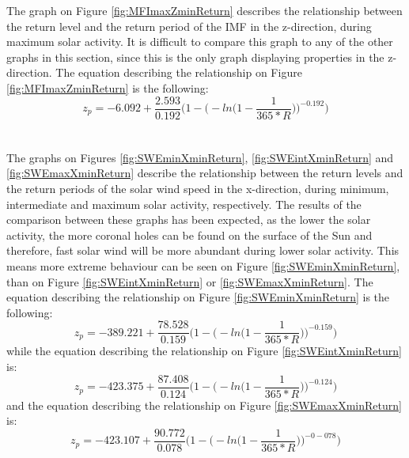 \documentclass[12pt]{article}
\begin{document}
        The graph on Figure \ref{fig:MFImaxZminReturn} describes the relationship between the return level and the return period of the IMF in the z-direction, during maximum solar activity. It is difficult to compare this graph to any of the other graphs in this section, since this is the only graph displaying properties in the z-direction. The equation describing the relationship on Figure \ref{fig:MFImaxZminReturn} is the following:
        \begin{equation}
            z_p = -6.092+\frac{2.593}{0.192}\Bigg( 1-\Bigg( -ln\Bigg( 1-\frac{1}{365*R}\Bigg) \Bigg) ^{-0.192}\Bigg)
        \end{equation}\\ \\
        The graphs on Figures \ref{fig:SWEminXminReturn}, \ref{fig:SWEintXminReturn} and \ref{fig:SWEmaxXminReturn} describe the relationship between the return levels and the return periods of the solar wind speed in the x-direction, during minimum, intermediate and maximum solar activity, respectively. The results of the comparison between these graphs has been expected, as the lower the solar activity, the more coronal holes can be found on the surface of the Sun and therefore, fast solar wind will be more abundant during lower solar activity. This means more extreme behaviour can be seen on Figure \ref{fig:SWEminXminReturn}, than on Figure \ref{fig:SWEintXminReturn} or \ref{fig:SWEmaxXminReturn}. The equation describing the relationship on Figure \ref{fig:SWEminXminReturn} is the following:
        \begin{equation}
            z_p = -389.221+\frac{78.528}{0.159}\Bigg( 1-\Bigg( -ln\Bigg( 1-\frac{1}{365*R}\Bigg) \Bigg) ^{-0.159}\Bigg)
        \end{equation}
        while the equation describing the relationship on Figure \ref{fig:SWEintXminReturn} is:
        \begin{equation}
            z_p = -423.375+\frac{87.408}{0.124}\Bigg( 1-\Bigg( -ln\Bigg( 1-\frac{1}{365*R}\Bigg) \Bigg) ^{-0.124}\Bigg)
        \end{equation}
        and the equation describing the relationship on Figure \ref{fig:SWEmaxXminReturn} is:
        \begin{equation}
            z_p = -423.107+\frac{90.772}{0.078}\Bigg( 1-\Bigg( -ln\Bigg( 1-\frac{1}{365*R}\Bigg) \Bigg) ^{-0-078}\Bigg)
        \end{equation}
\end{document}
